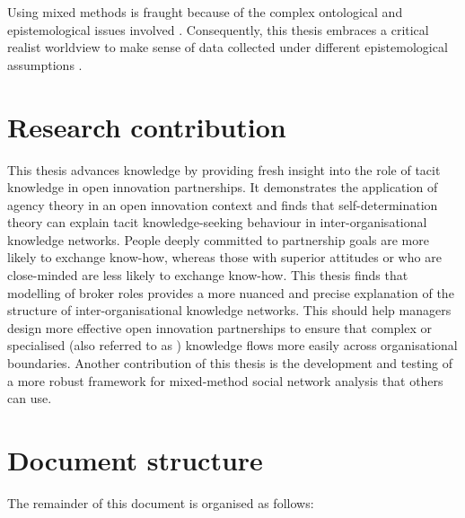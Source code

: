 Using mixed methods is fraught because of the complex ontological and epistemological issues involved \citep{giddings2006mixed,mcevoy2006critical}. Consequently, this thesis embraces a critical realist worldview to make sense of data collected under different epistemological assumptions \citep{johnson2004mixed,giddings2006mixed,welch2011theorising}. \medskip

\section{Research contribution}

This thesis advances knowledge by providing fresh insight into the role of tacit knowledge in open innovation partnerships. It demonstrates the application of agency theory in an open innovation context and finds that self-determination theory can explain tacit knowledge-seeking behaviour in inter-organisational knowledge networks. People deeply committed to partnership goals are more likely to exchange know-how, whereas those with superior attitudes or who are close-minded are less likely to exchange know-how. This thesis finds that modelling of broker roles provides a more nuanced and precise explanation of the structure of inter-organisational knowledge networks. This should help managers design more effective open innovation partnerships to ensure that complex or specialised (also referred to as ) knowledge flows more easily across organisational boundaries. Another contribution of this thesis is the development and testing of a more robust framework for mixed-method social network analysis that others can use. 
\section{Document structure}

The remainder of this document is organised as follows:

